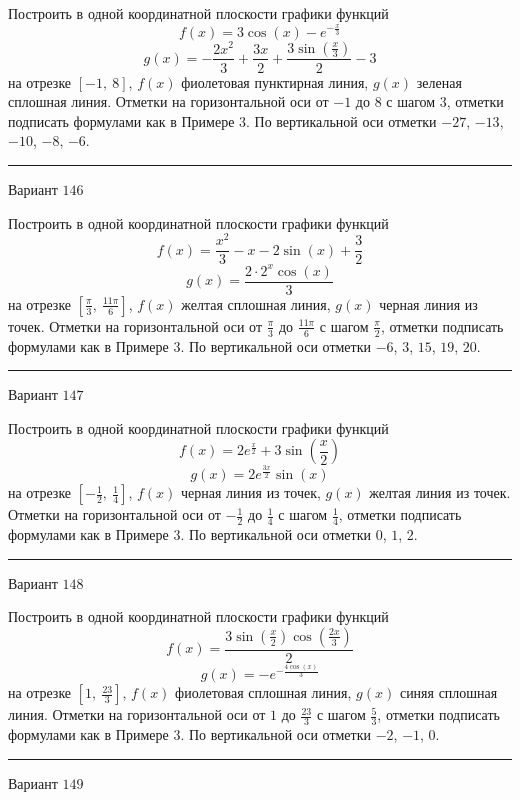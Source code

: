 \documentclass[11pt]{report}
\begin{document}
Построить в одной координатной плоскости графики функций $$f(x) = 3 \cos{\left(x \right)} - e^{- \frac{x}{3}}$$ $$g(x) = - \frac{2 x^{2}}{3} + \frac{3 x}{2} + \frac{3 \sin{\left(\frac{x}{3} \right)}}{2} - 3$$ на отрезке $\left[-1, \  8\right]$, $f(x)$ фиолетовая пунктирная линия, $g(x)$ зеленая сплошная линия. Отметки на горизонтальной оси от $-1$ до $8$ с шагом $3$, отметки подписать формулами как в Примере 3. По вертикальной оси отметки $-27$, $-13$, $-10$, $-8$, $-6$.
\begin{center}
\noindent\rule{8cm}{0.4pt}
\end{center}
Вариант $146$


Построить в одной координатной плоскости графики функций $$f(x) = \frac{x^{2}}{3} - x - 2 \sin{\left(x \right)} + \frac{3}{2}$$ $$g(x) = \frac{2 \cdot 2^{x} \cos{\left(x \right)}}{3}$$ на отрезке $\left[\frac{\pi}{3}, \  \frac{11 \pi}{6}\right]$, $f(x)$ желтая сплошная линия, $g(x)$ черная линия из точек. Отметки на горизонтальной оси от $\frac{\pi}{3}$ до $\frac{11 \pi}{6}$ с шагом $\frac{\pi}{2}$, отметки подписать формулами как в Примере 3. По вертикальной оси отметки $-6$, $3$, $15$, $19$, $20$.
\begin{center}
\noindent\rule{8cm}{0.4pt}
\end{center}
Вариант $147$


Построить в одной координатной плоскости графики функций $$f(x) = 2 e^{\frac{x}{2}} + 3 \sin{\left(\frac{x}{2} \right)}$$ $$g(x) = 2 e^{\frac{3 x}{2}} \sin{\left(x \right)}$$ на отрезке $\left[- \frac{1}{2}, \  \frac{1}{4}\right]$, $f(x)$ черная линия из точек, $g(x)$ желтая линия из точек. Отметки на горизонтальной оси от $- \frac{1}{2}$ до $\frac{1}{4}$ с шагом $\frac{1}{4}$, отметки подписать формулами как в Примере 3. По вертикальной оси отметки $0$, $1$, $2$.
\begin{center}
\noindent\rule{8cm}{0.4pt}
\end{center}
Вариант $148$


Построить в одной координатной плоскости графики функций $$f(x) = \frac{3 \sin{\left(\frac{x}{2} \right)} \cos{\left(\frac{2 x}{3} \right)}}{2}$$ $$g(x) = - e^{- \frac{4 \cos{\left(x \right)}}{3}}$$ на отрезке $\left[1, \  \frac{23}{3}\right]$, $f(x)$ фиолетовая сплошная линия, $g(x)$ синяя сплошная линия. Отметки на горизонтальной оси от $1$ до $\frac{23}{3}$ с шагом $\frac{5}{3}$, отметки подписать формулами как в Примере 3. По вертикальной оси отметки $-2$, $-1$, $0$.
\begin{center}
\noindent\rule{8cm}{0.4pt}
\end{center}
Вариант $149$
\end{document}
